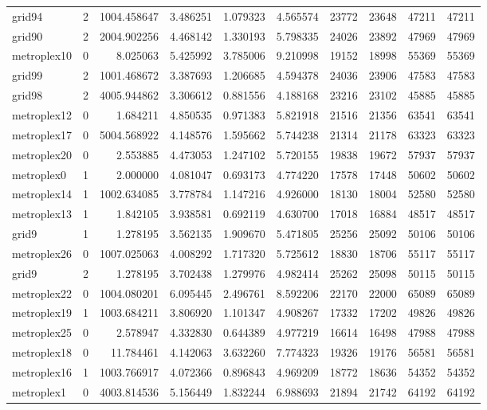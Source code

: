\begin{longtable}{|l|r|r|r|r|r|r|r|r|r|}
grid94 & 2 & 1004.458647 & 3.486251 & 1.079323 & 4.565574 & 23772 & 23648 & 47211 & 47211 \\
grid90 & 2 & 2004.902256 & 4.468142 & 1.330193 & 5.798335 & 24026 & 23892 & 47969 & 47969 \\
metroplex10 & 0 & 8.025063 & 5.425992 & 3.785006 & 9.210998 & 19152 & 18998 & 55369 & 55369 \\
grid99 & 2 & 1001.468672 & 3.387693 & 1.206685 & 4.594378 & 24036 & 23906 & 47583 & 47583 \\
grid98 & 2 & 4005.944862 & 3.306612 & 0.881556 & 4.188168 & 23216 & 23102 & 45885 & 45885 \\
metroplex12 & 0 & 1.684211 & 4.850535 & 0.971383 & 5.821918 & 21516 & 21356 & 63541 & 63541 \\
metroplex17 & 0 & 5004.568922 & 4.148576 & 1.595662 & 5.744238 & 21314 & 21178 & 63323 & 63323 \\
metroplex20 & 0 & 2.553885 & 4.473053 & 1.247102 & 5.720155 & 19838 & 19672 & 57937 & 57937 \\
metroplex0 & 1 & 2.000000 & 4.081047 & 0.693173 & 4.774220 & 17578 & 17448 & 50602 & 50602 \\
metroplex14 & 1 & 1002.634085 & 3.778784 & 1.147216 & 4.926000 & 18130 & 18004 & 52580 & 52580 \\
metroplex13 & 1 & 1.842105 & 3.938581 & 0.692119 & 4.630700 & 17018 & 16884 & 48517 & 48517 \\
grid9 & 1 & 1.278195 & 3.562135 & 1.909670 & 5.471805 & 25256 & 25092 & 50106 & 50106 \\
metroplex26 & 0 & 1007.025063 & 4.008292 & 1.717320 & 5.725612 & 18830 & 18706 & 55117 & 55117 \\
grid9 & 2 & 1.278195 & 3.702438 & 1.279976 & 4.982414 & 25262 & 25098 & 50115 & 50115 \\
metroplex22 & 0 & 1004.080201 & 6.095445 & 2.496761 & 8.592206 & 22170 & 22000 & 65089 & 65089 \\
metroplex19 & 1 & 1003.684211 & 3.806920 & 1.101347 & 4.908267 & 17332 & 17202 & 49826 & 49826 \\
metroplex25 & 0 & 2.578947 & 4.332830 & 0.644389 & 4.977219 & 16614 & 16498 & 47988 & 47988 \\
metroplex18 & 0 & 11.784461 & 4.142063 & 3.632260 & 7.774323 & 19326 & 19176 & 56581 & 56581 \\
metroplex16 & 1 & 1003.766917 & 4.072366 & 0.896843 & 4.969209 & 18772 & 18636 & 54352 & 54352 \\
metroplex1 & 0 & 4003.814536 & 5.156449 & 1.832244 & 6.988693 & 21894 & 21742 & 64192 & 64192 \\

\end{longtable}
